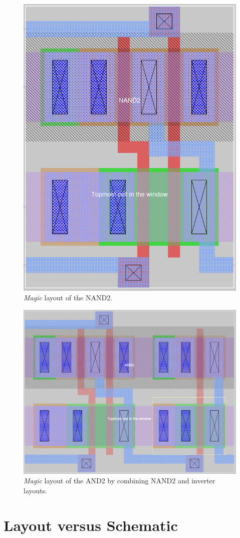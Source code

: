 \documentclass[11pt]{article}
\begin{document}
    \begin{figure}[!ht]
        \centering
        \includegraphics[width=0.8\linewidth]{nand2_mag.png}
        \caption{\textit{Magic} layout of the NAND2.}
        \label{fig:nand2mag}
    \end{figure}
    \begin{figure}[!ht]
        \centering
        \includegraphics[width=\linewidth]{and2mag.png}
        \caption{\textit{Magic} layout of the AND2 by combining NAND2 and inverter layouts.}
        \label{fig:nand2mag}
    \end{figure}

    \FloatBarrier
    \section{Layout versus Schematic}
    
\end{document}
